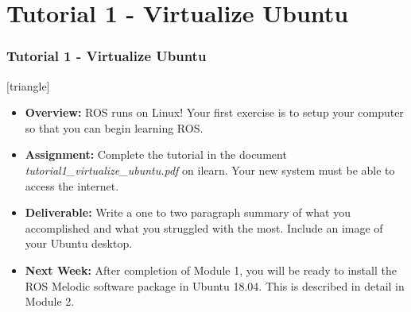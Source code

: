 \documentclass[fleqn]{beamer} %
\newcommand{\sectiontitleV}{Tutorial 1 - Virtualize Ubuntu}
\begin{document}
\section{\sectiontitleV}	
	           \begin{frame}[label=sectionV] \small
		\frametitle{\sectiontitleV}    
	
 [triangle]
                \begin{itemize}

					\item {\bf Overview:} ROS runs on Linux! Your first exercise is to setup your computer so that you can begin learning ROS. 		

					\item {\bf Assignment:} Complete the tutorial in the document {\it tutorial1\_virtualize\_ubuntu.pdf} on ilearn. Your new system must be able to access the internet.
                    
                    \item {\bf Deliverable:} Write a one to two paragraph summary of what you accomplished and what you struggled with the most. Include an image of your Ubuntu desktop. 
    
                    \item {\bf Next Week:} After completion of Module 1, you will be ready to install the ROS Melodic software package in Ubuntu 18.04. This is described in detail in Module 2. \vspc
                    
    
                \end{itemize}
		\end{frame}
\end{document}
